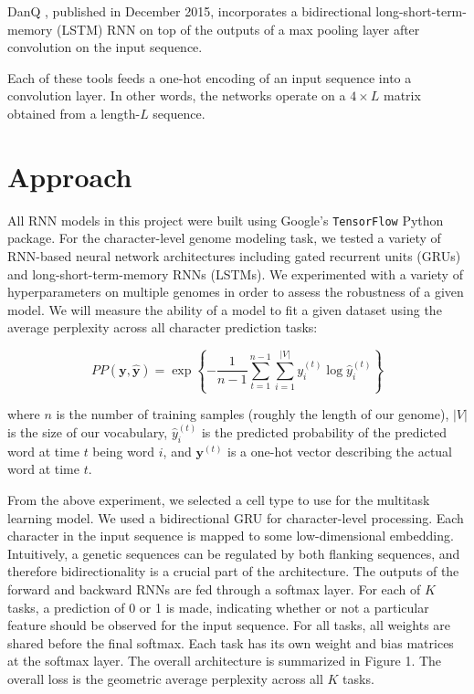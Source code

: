 \documentclass{article} %
\begin{document}
DanQ \cite{quang2015danq}, published in December 2015, incorporates a bidirectional long-short-term-memory (LSTM) RNN on top of the outputs of a max pooling layer after convolution on the input sequence.

Each of these tools feeds a one-hot encoding of an input sequence into a convolution layer. In other words, the networks operate on a $4\times L$ matrix obtained from a length-$L$ sequence. 

\section{Approach}

All RNN models in this project were built using Google's \texttt{TensorFlow} Python package. For the character-level genome modeling task, we tested a variety of RNN-based neural network architectures including gated recurrent units (GRUs) and long-short-term-memory RNNs (LSTMs). We experimented with a variety of hyperparameters on multiple genomes in order to assess the robustness of a given model. We will measure the ability of a model to fit a given dataset using the average perplexity across all character prediction tasks:

$$
	PP(\mathbf{y},\mathbf{\hat{y}}) = \exp \left\{-\frac{1}{n-1} \sum_{t=1}^{n-1} \sum_{i=1}^{|V|} y_i^{(t)} \log \hat{y}_i^{(t)}\right\}
$$

where $n$ is the number of training samples (roughly the length of our genome), $|V|$ is the size of our vocabulary, $\hat{y}^{(t)}_i$ is the predicted probability of the predicted word at time $t$ being word $i$, and $\mathbf{y}^{(t)}$ is a one-hot vector describing the actual word at time $t$.

From the above experiment, we selected a cell type to use for the multitask learning model. We used a bidirectional GRU for character-level processing. Each character in the input sequence is mapped to some low-dimensional embedding. Intuitively, a genetic sequences can be regulated by both flanking sequences, and therefore bidirectionality is a crucial part of the architecture. The outputs of the forward and backward RNNs are fed through a softmax layer. For each of $K$ tasks, a prediction of 0 or 1 is made, indicating whether or not a particular feature should be observed for the input sequence. For all tasks, all weights are shared before the final softmax. Each task has its own weight and bias matrices at the softmax layer. The overall architecture is summarized in Figure 1. The overall loss is the geometric average perplexity across all $K$ tasks. 
\end{document}
